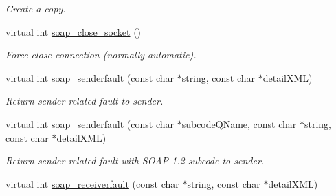 \begin{DoxyCompactItemize}
\begin{DoxyCompactList}\small\item\em Create a copy. \item\end{DoxyCompactList}\item 
\hypertarget{classPASSSubscriberPortBindingService_a9e58a2e96e2d42124c9abf1dce72370a}{
virtual int \hyperlink{classPASSSubscriberPortBindingService_a9e58a2e96e2d42124c9abf1dce72370a}{soap\_\-close\_\-socket} ()}
\label{classPASSSubscriberPortBindingService_a9e58a2e96e2d42124c9abf1dce72370a}

\begin{DoxyCompactList}\small\item\em Force close connection (normally automatic). \item\end{DoxyCompactList}\item 
\hypertarget{classPASSSubscriberPortBindingService_a99fa395b087a58dc4504db59e8a76588}{
virtual int \hyperlink{classPASSSubscriberPortBindingService_a99fa395b087a58dc4504db59e8a76588}{soap\_\-senderfault} (const char $\ast$string, const char $\ast$detailXML)}
\label{classPASSSubscriberPortBindingService_a99fa395b087a58dc4504db59e8a76588}

\begin{DoxyCompactList}\small\item\em Return sender-\/related fault to sender. \item\end{DoxyCompactList}\item 
\hypertarget{classPASSSubscriberPortBindingService_a9f28814dcc468a54e935b2f03da79034}{
virtual int \hyperlink{classPASSSubscriberPortBindingService_a9f28814dcc468a54e935b2f03da79034}{soap\_\-senderfault} (const char $\ast$subcodeQName, const char $\ast$string, const char $\ast$detailXML)}
\label{classPASSSubscriberPortBindingService_a9f28814dcc468a54e935b2f03da79034}

\begin{DoxyCompactList}\small\item\em Return sender-\/related fault with SOAP 1.2 subcode to sender. \item\end{DoxyCompactList}\item 
\hypertarget{classPASSSubscriberPortBindingService_a1da50eaeb741432e3c8badc2759eb26f}{
virtual int \hyperlink{classPASSSubscriberPortBindingService_a1da50eaeb741432e3c8badc2759eb26f}{soap\_\-receiverfault} (const char $\ast$string, const char $\ast$detailXML)}
\label{classPASSSubscriberPortBindingService_a1da50eaeb741432e3c8badc2759eb26f}


\end{DoxyCompactItemize}
